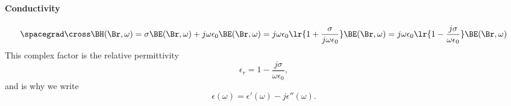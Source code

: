 \paragraph{Conductivity}
%
%
\begin{dmath}\label{eqn:druid:260}
\spacegrad \cross \BH(\Br, \omega)
= \sigma \BE(\Br, \omega) + j \omega \epsilon_0 \BE(\Br, \omega)
= j \omega \epsilon_0 \lr{ 1 + \frac{\sigma}{j \omega \epsilon_0} } \BE(\Br, \omega)
= j \omega \epsilon_0 \lr{ 1 - \frac{j \sigma}{\omega \epsilon_0} } \BE(\Br, \omega)
\end{dmath}
%
This complex factor is the relative permittivity
%
\begin{dmath}\label{eqn:druid:280}
\epsilon_r
= 1 - \frac{j \sigma}{\omega \epsilon_0},
\end{dmath}
%
and is why we write
%
\begin{dmath}\label{eqn:druid:300}
\epsilon(\omega) = \epsilon'(\omega) - j \epsilon''(\omega).
\end{dmath}
%
